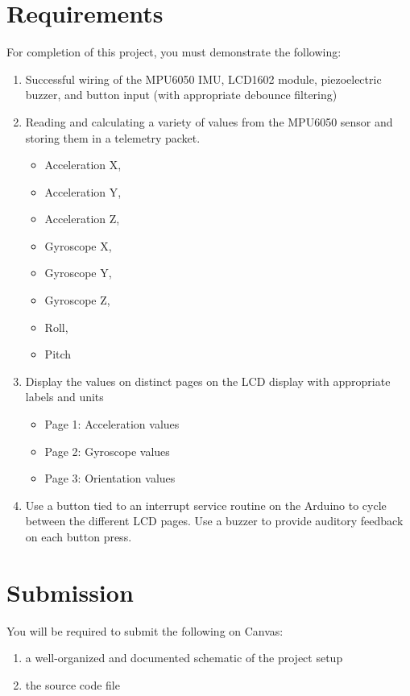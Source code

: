 \section*{Requirements} 
For completion of this project, you must demonstrate the following:
\begin{enumerate}
    \item Successful wiring of the MPU6050 IMU, LCD1602 module, piezoelectric buzzer, and button input (with appropriate debounce filtering)
    \item Reading and calculating a variety of values from the MPU6050 sensor and storing them in a telemetry packet.
        \begin{itemize}
            \item Acceleration X,
            \item Acceleration Y,
            \item Acceleration Z,
            \item Gyroscope X,
            \item Gyroscope Y,
            \item Gyroscope Z,
            \item Roll,
            \item Pitch
        \end{itemize}    
    \item Display the values on distinct pages on the LCD display with appropriate labels and units
        \begin{itemize}
            \item Page 1: Acceleration values
            \item Page 2: Gyroscope values
            \item Page 3: Orientation values
        \end{itemize}
    \item Use a button tied to an interrupt service routine on the Arduino to cycle between the different LCD pages. Use a buzzer to provide auditory feedback on each button press.
\end{enumerate}

\section*{Submission}
You will be required to submit the following on Canvas:
\begin{enumerate}
    \item a well-organized and documented schematic of the project setup 
    \item the source code file
\end{enumerate}

